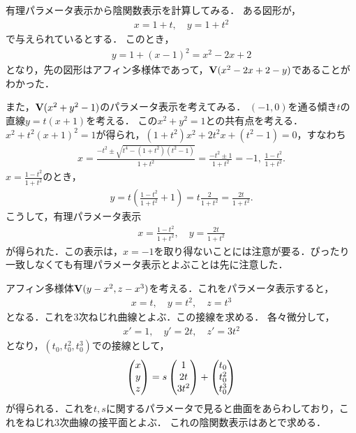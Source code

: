 \documentclass[9pt]{ltjsarticle}
\begin{document}
有理パラメータ表示から陰関数表示を計算してみる．
ある図形が，
\begin{align}
 x=1+t,\quad y=1+t^2
\end{align}
で与えられているとする．
このとき，
\begin{align}
 y=1+(x-1)^2 = x^2 -2x +2
\end{align}
となり，先の図形はアフィン多様体であって，$\textbf V(x^2-2x+2-y)$であることがわかった．

また，$\textbf V(x^2+y^2-1)$のパラメータ表示を考えてみる．
$(-1,0)$を通る傾き$t$の直線$y=t(x+1)$を考える．
この$x^2+y^2=1$との共有点を考える．
$ x^2 + t^2(x+1)^2 = 1$が得られ，$(1+t^2)x^2 + 2t^2 x + (t^2-1)= 0$，すなわち
\begin{align}
 x= \frac{-t^2 \pm \sqrt{t^4 - (1+t^2)(t^2-1)}}{1+t^2}
=
\frac{-t^2 \pm 1}{1+t^2}
=
-1,\,\frac{1-t^2}{1+t^2}.
\end{align}
$x=\frac{1-t^2}{1+t^2}$のとき，
\begin{align}
 y=t(\frac{1-t^2}{1+t^2}+1)=
t\frac{2}{1+t^2}=
\frac{2t}{1+t^2}.
\end{align}
こうして，有理パラメータ表示
\begin{align}
 x=\frac{1-t^2}{1+t^2},\quad y=\frac{2t}{1+t^2}
\end{align}
が得られた．この表示は，$x=-1$を取り得ないことには注意が要る．ぴったり一致しなくても有理パラメータ表示とよぶことは先に注意した．

アフィン多様体$\textbf V(y-x^2,z-x^3)$を考える．これをパラメータ表示すると，
\begin{align}
 x = t,\quad y=t^2,\quad z=t^3
\end{align}
となる．これを3次ねじれ曲線とよぶ．この接線を求める．
各々微分して，
\begin{align}
 x' = 1,\quad y'= 2t,\quad z' = 3t^2
\end{align}
となり，$(t_0,t_0^2,t_0^3)$での接線として，
\begin{align}
 \left(\begin{matrix} x \\ y \\ z \end{matrix}\right) = s\left(\begin{matrix} 1 \\ 2t \\ 3t^2 \end{matrix}\right) + \left(\begin{matrix} t_0 \\ t_0^2 \\ t_0^3 \end{matrix}\right)
\end{align}
が得られる．これを$t,s$に関するパラメータで見ると曲面をあらわしており，これをねじれ3次曲線の接平面とよぶ．
これの陰関数表示はあとで求める．
\end{document}
